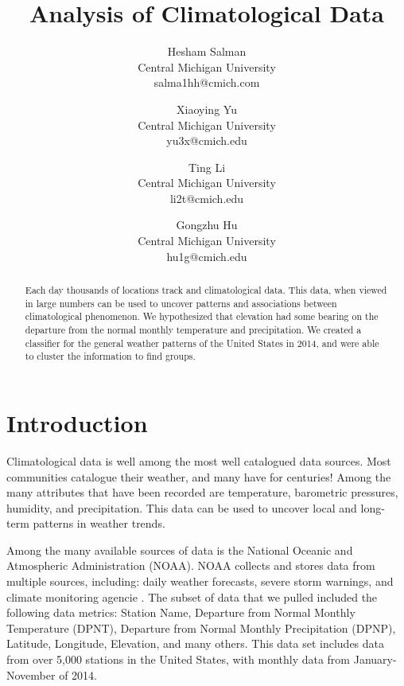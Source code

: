 \documentclass[11pt]{article}
\begin{document}
\title{Analysis of Climatological Data}
\author{ Hesham Salman\\Central Michigan University\\salma1hh@cmich.com
\and Xiaoying Yu\\Central Michigan University\\yu3x@cmich.edu
\and Ting Li\\Central Michigan University\\li2t@cmich.edu
\and Gongzhu Hu\\Central Michigan University\\hu1g@cmich.edu
}
\maketitle
\newpage

%
%
\begin{abstract}
Each day thousands of locations track and climatological data. This data, when viewed in large numbers can be used to uncover patterns and associations between climatological phenomenon. We hypothesized that elevation had some bearing on the departure from the normal monthly temperature and precipitation. We created a classifier for the general weather patterns of the United States in 2014, and were able to cluster the information to find groups.
\end{abstract}
\newpage

\section{Introduction}
Climatological data is well among the most well catalogued data sources. Most communities catalogue their weather, and many have for centuries! Among the many attributes that have been recorded are temperature, barometric pressures, humidity, and precipitation. This data can be used to uncover local and long-term patterns in weather trends.

Among the many available sources of data is the National Oceanic and Atmospheric Administration (NOAA)\cite{center2010national}. NOAA collects and stores data from multiple sources, including: daily weather forecasts, severe storm warnings, and climate monitoring agencie \cite{center2010national}. The subset of data that we pulled included the following data metrics: Station Name, Departure from Normal Monthly Temperature (DPNT), Departure from Normal Monthly Precipitation (DPNP), Latitude, Longitude, Elevation, and many others. This data set includes data from over 5,000 stations in the United States, with monthly data from January-November of 2014.
\end{document}

